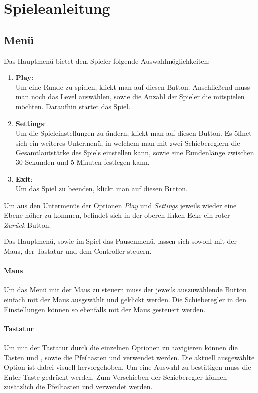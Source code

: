\setlength{\parindent}{0em}

\chapter{Spieleanleitung}

\label{Chapter2}

\section{Menü}
\label{menu}
Das Hauptmenü bietet dem Spieler folgende Auswahlmöglichkeiten:

\begin{enumerate}
    \item \textbf{Play}:\\
    Um eine Runde zu spielen, klickt man auf diesen Button. Anschließend muss man noch das Level auswählen, sowie die Anzahl der Spieler die mitspielen möchten. Daraufhin startet das Spiel.
    \item \textbf{Settings}:\\
    Um die Spieleinstellungen zu ändern, klickt man auf diesen Button. Es öffnet sich ein weiteres Untermenü, in welchem man mit zwei Schiebereglern die Gesamtlautstärke des Spiels einstellen kann, sowie eine Rundenlänge zwischen 30 Sekunden und 5 Minuten festlegen kann.
    \item \textbf{Exit}:\\
    Um das Spiel zu beenden, klickt man auf diesen Button.
\end{enumerate}

Um aus den Untermenüs der Optionen \textit{Play} und \textit{Settings} jeweils wieder eine Ebene höher zu kommen, befindet sich in der oberen linken Ecke ein roter \textit{Zurück}-Button.

Das Hauptmenü, sowie im Spiel das Pausenmenü, lassen sich sowohl mit der Maus, der Tastatur und dem Controller steuern.

\subsubsection*{Maus}
Um das Menü mit der Maus zu steuern muss der jeweils auszuwählende Button einfach mit der Maus ausgewählt und geklickt werden. Die Schieberegler in den Einstellungen können so ebenfalls mit der Maus gesteuert werden.

\subsubsection*{Tastatur}
Um mit der Tastatur durch die einzelnen Optionen zu navigieren können die Tasten  und , sowie die Pfeiltasten \keys{\arrowkeyup} und \keys{\arrowkeydown} verwendet werden. Die aktuell ausgewählte Option ist dabei visuell hervorgehoben. Um eine Auswahl zu bestätigen muss die Enter Taste \keys{\return} gedrückt werden. Zum Verschieben der Schieberegler können zusätzlich die Pfeiltasten \keys{\arrowkeyleft} und \keys{\arrowkeyright} verwendet werden.

